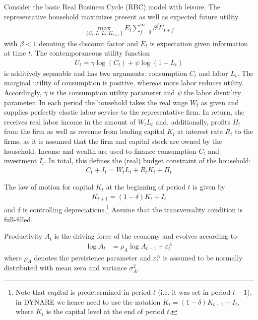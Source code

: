 Consider the basic Real Business Cycle (RBC) model with leisure. The representative household maximizes present as well as expected future utility
\begin{align*}
    \underset{\{C_{t},I_{t},L_t,K_{t+1}\}}{\max} E_t \sum_{j=0}^{\infty} \beta^{j} U_{t+j}
\end{align*}
with $\beta <1$ denoting the discount factor and $E_t$ is expectation given information at time $t$. The contemporaneous utility function
\begin{align*}
    U_t = \gamma \log(C_t) + \psi \log{(1-L_t)}
\end{align*}
is additively separable and has two arguments: consumption $C_t$ and labor $L_t$. The marginal utility of consumption is positive, whereas more labor reduces utility. Accordingly, $\gamma$ is the consumption utility parameter and $\psi$ the labor disutility parameter. In each period the household takes the real wage $W_t$ as given and supplies perfectly elastic labor service to the representative firm. In return, she receives real labor income in the amount of $W_t L_t$ and, additionally, profits $\Pi_t$ from the firm as well as revenue from lending capital $K_t$ at interest rate $R_t$ to the firms, as it is assumed that the firm and capital stock are owned by the household. Income and wealth are used to finance consumption $C_t$ and investment $I_t$. In total, this defines the (real) budget constraint of the household:
\begin{align*}
    C_t + I_t = W_t L_t + R_t K_t + \Pi_t
\end{align*}

The law of motion for capital $K_t$ at the beginning of period $t$ is given by
\begin{align*}
    K_{t+1} = (1-\delta)K_t + I_t
\end{align*}
and $\delta$ is controlling depreciations.\footnote{Note that capital is predetermined in period $t$ (i.e. it was set in period $t-1$), in DYNARE we hence need to use the notation $K_t = (1-\delta)K_{t-1} + I_t$, where $K_t$ is the capital level at the end of period $t$.} Assume that the transversality condition is full-filled.

Productivity $A_t$ is the driving force of the economy and evolves according to
\begin{align*}
    \log{A_{t}} & = \rho_A \log{A_{t-1}}  + \varepsilon_t^A
\end{align*}
where $\rho_A$ denotes the persistence parameter and $\varepsilon_t^A$ is assumed to be normally distributed with mean zero and variance $\sigma_A^2$.

